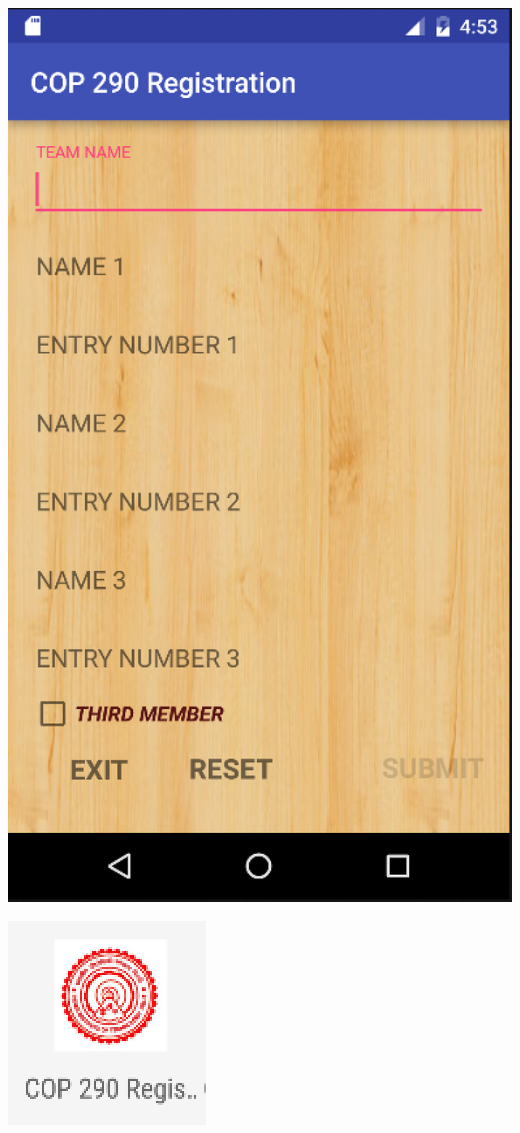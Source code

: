 \documentclass[12pt]{article}
\begin{document}
            \begin{minipage}{\linewidth}
	        \centering
	        \includegraphics[scale=.7]{MAINSCREENFINAL.png}
            \end{minipage}
            \begin{minipage}{\linewidth}
	        \centering
	        \includegraphics[scale=.5]{LOGO.png}
            \end{minipage}
            \\
\end{document}

